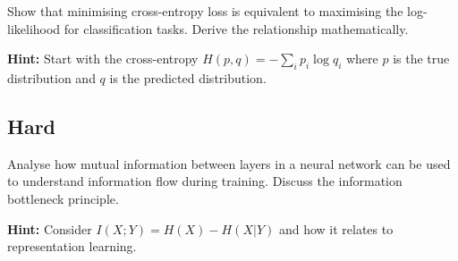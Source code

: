\begin{problem}
Show that minimising cross-entropy loss is equivalent to maximising the log-likelihood for classification tasks. Derive the relationship mathematically.

\textbf{Hint:} Start with the cross-entropy $H(p,q) = -\sum_i p_i \log q_i$ where $p$ is the true distribution and $q$ is the predicted distribution.
\end{problem}

\subsection*{Hard}

\begin{problem}
Analyse how mutual information between layers in a neural network can be used to understand information flow during training. Discuss the information bottleneck principle.

\textbf{Hint:} Consider $I(X;Y) = H(X) - H(X|Y)$ and how it relates to representation learning.
\end{problem}

